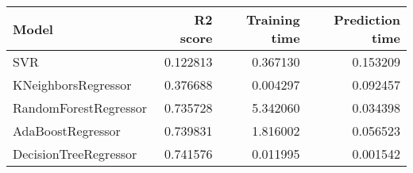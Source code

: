\begin{tabular}{lrrr}
\toprule
Model & R2 score & Training time & Prediction time \\
\midrule
SVR & 0.122813 & 0.367130 & 0.153209 \\
KNeighborsRegressor & 0.376688 & 0.004297 & 0.092457 \\
RandomForestRegressor & 0.735728 & 5.342060 & 0.034398 \\
AdaBoostRegressor & 0.739831 & 1.816002 & 0.056523 \\
DecisionTreeRegressor & 0.741576 & 0.011995 & 0.001542 \\
\bottomrule
\end{tabular}
